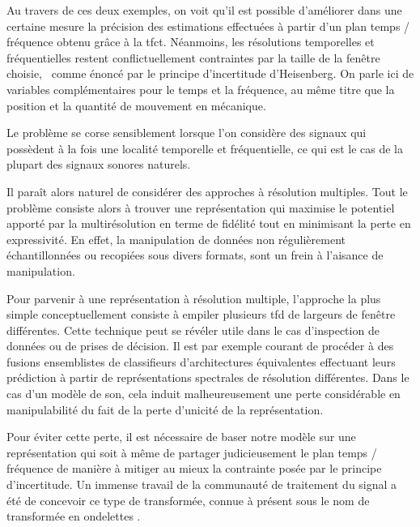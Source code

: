 Au travers de ces deux exemples, on voit qu'il est possible d'améliorer dans une certaine mesure la précision des estimations effectuées à partir d'un plan temps / fréquence obtenu grâce à la tfct. Néanmoins, les résolutions temporelles et fréquentielles restent conflictuellement contraintes par la taille de la fenêtre choisie,~\cite{slepian1983some} comme énoncé par le principe d'incertitude d'Heisenberg. On parle ici de variables complémentaires pour le temps et la fréquence, au même titre que la position et la quantité de mouvement en mécanique.

Le problème se corse sensiblement lorsque l'on considère des signaux qui possèdent à la fois une localité temporelle et fréquentielle, ce qui est le cas de la plupart des signaux sonores naturels.

Il paraît alors naturel de considérer des approches à résolution multiples. Tout le problème consiste alors à trouver une représentation qui maximise le potentiel apporté par la multirésolution en terme de fidélité tout en minimisant la perte en expressivité. En effet, la manipulation de données non régulièrement échantillonnées ou recopiées sous divers formats, sont un frein à l'aisance de manipulation.


Pour parvenir à une représentation à résolution multiple, l'approche la plus simple conceptuellement consiste à \og empiler \fg plusieurs tfd de largeurs de fenêtre différentes. Cette technique peut se révéler utile dans le cas d'inspection de données ou de prises de décision. Il est par exemple courant de procéder à des fusions ensemblistes de classifieurs d'architectures équivalentes effectuant leurs prédiction à partir de représentations spectrales de résolution différentes. Dans le cas d'un modèle de son, cela induit malheureusement une perte considérable en manipulabilité du fait de la perte d'unicité de la représentation.

Pour éviter cette perte, il est nécessaire de baser notre modèle sur une représentation qui soit à même de partager judicieusement le plan temps / fréquence de manière à mitiger au mieux la contrainte posée par le principe d'incertitude. Un immense travail de la communauté de traitement du signal a été de concevoir ce type de transformée, connue à présent sous le nom de transformée en \og ondelettes \fg.~\cite{mallat1989theory}



